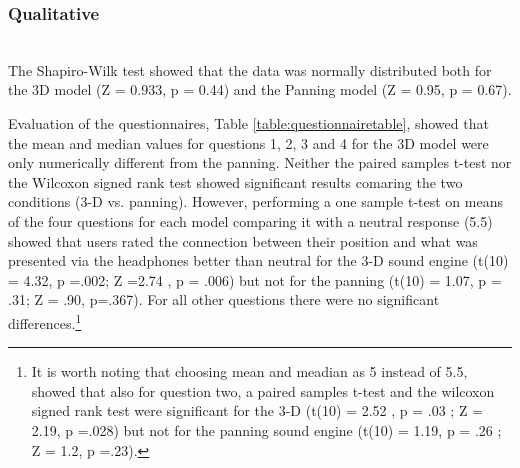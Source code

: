 \documentclass[journal]{IEEEtran}
\begin{document}
\subsubsection{Qualitative}~\\
The Shapiro-Wilk test showed that the data was normally distributed both for the 3D model (Z = 0.933, p = 0.44) and the Panning model (Z = 0.95, p = 0.67). 

Evaluation of the questionnaires, Table \ref{table:questionnairetable}, showed that the mean and median values for questions 1, 2, 3 and 4 for the 3D model were only numerically different from the panning. Neither the paired samples t-test nor the Wilcoxon signed rank test showed significant results comaring the two conditions (3-D vs. panning). However, performing a one sample t-test on means of the four questions for each model comparing it with a neutral response (5.5) showed that users rated the connection between their position and what was presented via the headphones better than neutral for the 3-D sound engine (t(10) = 4.32, p =.002; Z =2.74 , p = .006) but not for the panning (t(10) = 1.07, p = .31; Z = .90, p=.367). For all other questions there were no significant differences.\footnote{It is worth noting that choosing mean and meadian as 5 instead of 5.5, showed that also for question two, a paired samples t-test and the wilcoxon signed rank test were significant for the 3-D (t(10) = 2.52 , p = .03 ; Z = 2.19, p =.028) but not for the panning sound engine (t(10) = 1.19, p = .26 ; Z = 1.2, p =.23).}

\begin{table}[h]
  \caption{Questionnaire results}
  \label{table:questionnairetable}
\end{table}
\end{document}
